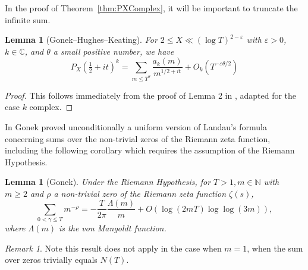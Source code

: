 \documentclass[12pt,a4paper,reqno]{amsart}
\newtheorem{lemma}[theorem]{Lemma}
\theoremstyle{remark}
\newtheorem*{remark}{Remark}
\numberwithin{equation}{section}
\newcommand{\ii}{i}
\newcommand{\CC}{\mathbb{C}}
\begin{document}
In the proof of Theorem~\ref{thm:PXComplex}, it will be important to truncate the infinite sum.
\begin{lemma}[Gonek--Hughes--Keating]\label{lem:TruncatePX}
For $2 \leq X \ll (\log T)^{2-\varepsilon}$ with $\varepsilon>0$, $k \in \CC$, and $\theta$ a small positive number, we have
\[
P_X(\tfrac12 + \ii t)^k = \sum_{m \leq T^{\theta}} \frac{a_k(m)}{m^{1/2 + \ii t}} + O_k\left(T^{-\varepsilon \theta / 2}\right)
\]
\end{lemma}

\begin{proof}
    This follows immediately from the proof of Lemma 2 in \cite{GHK07}, adapted for the case $k$ complex.
\end{proof}


In \cite{Gon93} Gonek proved unconditionally a uniform version of Landau's formula concerning sums over the non-trivial zeros of the Riemann zeta function, including the following corollary which requires the assumption of the Riemann Hypothesis.
\begin{lemma}[Gonek]\label{lem:LandauGonek}
Under the Riemann Hypothesis, for $T>1, m \in \mathbb{N}$ with $m\geq 2$ and $\rho$ a non-trivial zero of the Riemann zeta function $\zeta (s)$,
\begin{equation*}
\sum_{0< \gamma \leq T} m^{-\rho} = - \frac{T}{2 \pi} \frac{ \Lambda (m)}{m} + O(\log (2mT) \log\log (3m)),
\end{equation*}
where  $\Lambda (m)$ is the von Mangoldt function.
\end{lemma}

\begin{remark}
    Note this result does not apply in the case when $m=1$, when the sum over zeros trivially equals $N(T)$.
\end{remark}
\end{document}

